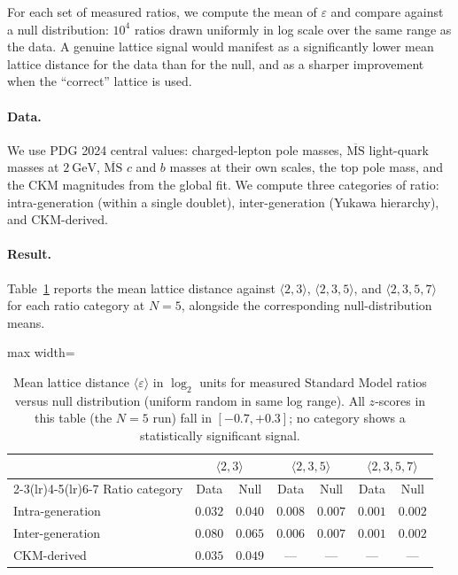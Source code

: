 \documentclass[11pt]{article}
\theoremstyle{plain}
\theoremstyle{remark}
\begin{document}
For each set of measured ratios, we compute the mean of
$\varepsilon$ and compare against a null distribution: $10^4$
ratios drawn uniformly in log scale over the same range as the
data.  A genuine lattice signal would manifest as a
significantly lower mean lattice distance for the data than for
the null, and as a sharper improvement when the
``correct'' lattice is used.

\paragraph{Data.}
We use PDG 2024 central values: charged-lepton pole masses,
$\overline{\mathrm{MS}}$ light-quark masses at $2~\mathrm{GeV}$,
$\overline{\mathrm{MS}}$ $c$ and $b$ masses at their own scales,
the top pole mass, and the CKM magnitudes from the global fit.
We compute three categories of ratio: intra-generation
(within a single doublet), inter-generation (Yukawa hierarchy),
and CKM-derived.

\paragraph{Result.}
Table~\ref{tab:empirical-result} reports the mean lattice
distance against $\langle 2, 3 \rangle$, $\langle 2, 3, 5 \rangle$,
and $\langle 2, 3, 5, 7 \rangle$ for each ratio category at
$N = 5$, alongside the corresponding null-distribution means.

\begin{table}[h]
\centering
\small
\begin{adjustbox}{max width=\linewidth}\begin{tabular}{lcccccc}
\toprule
& \multicolumn{2}{c}{$\langle 2, 3 \rangle$}
& \multicolumn{2}{c}{$\langle 2, 3, 5 \rangle$}
& \multicolumn{2}{c}{$\langle 2, 3, 5, 7 \rangle$}\\
\cmidrule(lr){2-3}\cmidrule(lr){4-5}\cmidrule(lr){6-7}
Ratio category & Data & Null
& Data & Null
& Data & Null \\
\midrule
Intra-generation & $0.032$ & $0.040$
& $0.008$ & $0.007$
& $0.001$ & $0.002$ \\
Inter-generation & $0.080$ & $0.065$
& $0.006$ & $0.007$
& $0.001$ & $0.002$ \\
CKM-derived      & $0.035$ & $0.049$
& --- & ---
& --- & --- \\
\bottomrule
\end{tabular}\end{adjustbox}
\caption{Mean lattice distance $\langle \varepsilon \rangle$ in
$\log_2$ units for measured Standard Model ratios versus
null distribution (uniform random in same log range).  All
$z$-scores in this table (the $N = 5$ run) fall in $[-0.7, +0.3]$; no
category shows a statistically significant signal.}
\label{tab:empirical-result}
\end{table}
\end{document}
